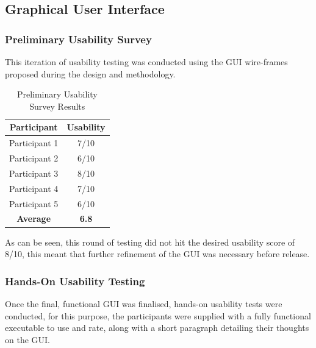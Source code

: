     \clearpage
    \subsection{Graphical User Interface}

        \subsubsection{Preliminary Usability Survey}
        This iteration of usability testing was conducted using the GUI wire-frames proposed during the design and methodology.

        \FloatBarrier
        \begin{table}[ht]
            \centering
            \caption{Preliminary Usability Survey Results}
            \label{tab:preliminary_usability_survey}
            \begin{tabular}{c|c}
                \textbf{Participant} & \textbf{Usability} \\
                \hline\hline
                Participant 1 & 7/10 \\ \hline
                Participant 2 & 6/10 \\ \hline
                Participant 3 & 8/10 \\ \hline
                Participant 4 & 7/10 \\ \hline
                Participant 5 & 6/10 \\
                \hline\hline
                \textbf{Average} & \textbf{6.8} \\
            \end{tabular}
        \end{table}
        \FloatBarrier
        As can be seen, this round of testing did not hit the desired usability score of 8/10, this meant that further refinement of the GUI was necessary before release.

        \subsubsection{Hands-On Usability Testing}
        Once the final, functional GUI was finalised, hands-on usability tests were conducted, for this purpose, the participants were supplied with a fully functional executable to use and rate, along with a short paragraph detailing their thoughts on the GUI.

